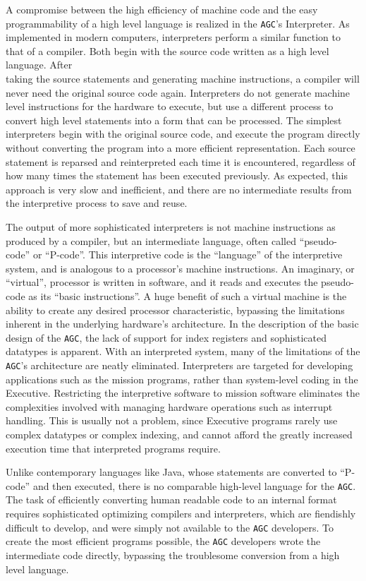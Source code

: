 \documentclass[refcap, oxford]{ahsan}
\begin{document}
A compromise between the high efficiency of machine code and the easy programmability of a high level language is realized in the \texttt{AGC}'s Interpreter. As implemented in modern computers, interpreters perform a similar function to that of a compiler. Both begin with the source code written as a high level language. After\\
taking the source statements and generating machine instructions, a compiler will never need the original source code again. Interpreters do not generate machine level instructions for the hardware to execute, but use a different process to convert high level statements into a form that can be processed. The simplest interpreters begin with the original source code, and execute the program directly without converting the program into a more efficient representation. Each source statement is reparsed and reinterpreted each time it is encountered, regardless of how many times the statement has been executed previously. As expected, this approach is very slow and inefficient, and there are no intermediate results from the interpretive process to save and reuse.

The output of more sophisticated interpreters is not machine instructions as produced by a compiler, but an intermediate language, often called ``pseudo-code'' or ``P-code''. This interpretive code is the ``language'' of the interpretive system, and is analogous to a processor's machine instructions. An imaginary, or ``virtual'', processor is written in software, and it reads and executes the pseudo-code as its ``basic instructions''. A huge benefit of such a virtual machine is the ability to create any desired processor characteristic, bypassing the limitations inherent in the underlying hardware's architecture. In the description of the basic design of the \texttt{AGC}, the lack of support for index registers and sophisticated datatypes is apparent. With an interpreted system, many of the limitations of the \texttt{AGC}'s architecture are neatly eliminated. Interpreters are targeted for developing applications such as the mission programs, rather than system-level coding in the Executive. Restricting the interpretive software to mission software eliminates the complexities involved with managing hardware operations such as interrupt handling. This is usually not a problem, since Executive programs rarely use complex datatypes or complex indexing, and cannot afford the greatly increased execution time that interpreted programs require.

Unlike contemporary languages like Java, whose statements are converted to ``P-code'' and then executed, there is no comparable high-level language for the \texttt{AGC}. The task of efficiently converting human readable code to an internal format requires sophisticated optimizing compilers and interpreters, which are fiendishly difficult to develop, and were simply not available to the \texttt{AGC} developers. To create the most efficient programs possible, the \texttt{AGC} developers wrote the intermediate code directly, bypassing the troublesome conversion from a high level language.
\end{document}
